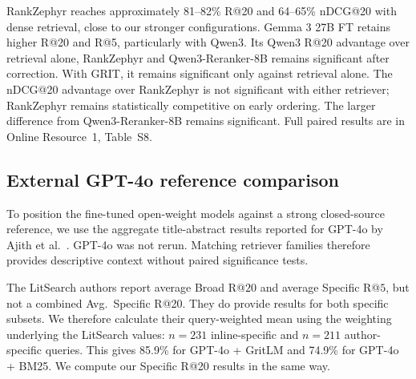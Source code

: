 \documentclass[pdflatex,sn-basic,Numbered]{sn-jnl}%
\theoremstyle{thmstyleone}%
\theoremstyle{thmstyletwo}%
\theoremstyle{thmstylethree}%
\begin{document}
RankZephyr reaches approximately 81--82\% R@20 and 64--65\% nDCG@20 with
dense retrieval, close to our stronger configurations. Gemma 3 27B FT retains
higher R@20 and R@5, particularly with Qwen3. Its Qwen3 R@20 advantage over
retrieval alone, RankZephyr and Qwen3-Reranker-8B remains significant after
correction. With GRIT, it remains significant only against retrieval alone.
The nDCG@20 advantage over RankZephyr is not significant with either retriever;
RankZephyr remains statistically competitive on early ordering. The larger
difference from Qwen3-Reranker-8B remains significant. Full paired results are
in Online Resource~1, Table~S8.

\subsection{External GPT-4o reference comparison}
\label{supp:gpt4o}

To position the fine-tuned open-weight models against a strong closed-source
reference, we use the aggregate title-abstract results reported for GPT-4o by
Ajith et al.~\cite{Ajith}. GPT-4o was not rerun. Matching retriever families
therefore provides descriptive context without paired significance tests.

The LitSearch authors report average Broad R@$20$ and average Specific R@$5$,
but not a combined Avg.\ Specific R@20. They do provide results for both specific
subsets. We therefore calculate their query-weighted mean using the weighting
underlying the LitSearch values: $n=231$ inline-specific and $n=211$
author-specific queries. This gives 85.9\% for GPT-4o + GritLM and 74.9\% for
GPT-4o + BM25. We compute our Specific R@20 results in the same way.
\end{document}
